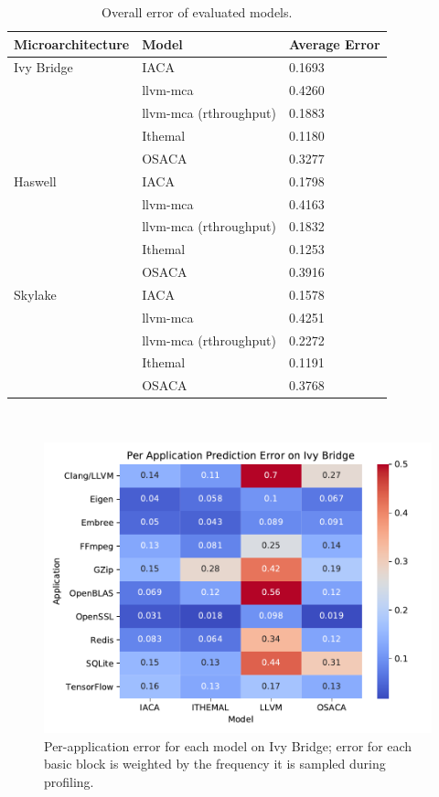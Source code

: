 


\begin{table}
\begin{tabular}{|p{}|p{}|p{}|}
\hline

\textbf{Microarchitecture} & \textbf{Model} & \textbf{Average Error}\\
\hline

Ivy Bridge & IACA & 0.1693\\
    & llvm-mca & 0.4260\\
    & llvm-mca (rthroughput) & 0.1883 \\
    & Ithemal & 0.1180\\
    & OSACA & 0.3277\\
\hline

Haswell & IACA & 0.1798\\
    & llvm-mca & 0.4163\\
    & llvm-mca (rthroughput) & 0.1832 \\
    & Ithemal & 0.1253\\
    & OSACA & 0.3916\\
    
\hline 
Skylake & IACA & 0.1578\\
    & llvm-mca & 0.4251\\
    & llvm-mca (rthroughput) & 0.2272 \\
    & Ithemal & 0.1191\\
    & OSACA & 0.3768\\

\hline
\end{tabular}
\\
\caption{Overall error of evaluated models.}
\label{tab:overall}
\end{table}


\begin{figure} \includegraphics[width=\columnwidth]{figures/ivb-app-err.pdf} \caption{Per-application error for each model on Ivy Bridge;
error for each basic block is weighted by the frequency it is sampled during profiling.}
\label{fig:ivb-app-err}
\end{figure}

